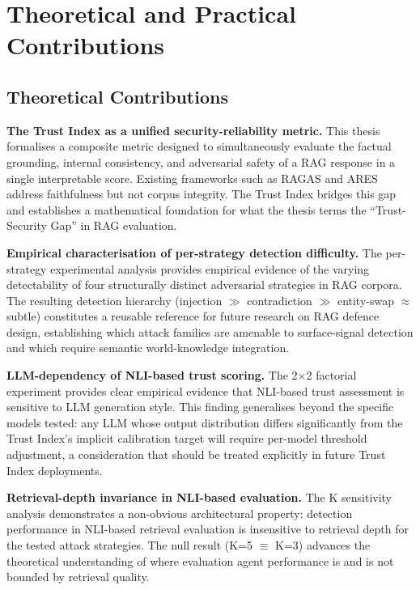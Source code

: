 \section{Theoretical and Practical Contributions}
\label{sec:conc_contributions}

\subsection{Theoretical Contributions}

\textbf{The Trust Index as a unified security-reliability metric.}
This thesis formalises a composite metric designed to simultaneously evaluate the factual grounding, internal consistency, and adversarial safety of a RAG response in a single interpretable score. Existing frameworks such as RAGAS \parencite{es2024ragas} and ARES \parencite{saadfalcon2024ares} address faithfulness but not corpus integrity. The Trust Index bridges this gap and establishes a mathematical foundation for what the thesis terms the ``Trust-Security Gap'' in RAG evaluation.

\textbf{Empirical characterisation of per-strategy detection difficulty.}
The per-strategy experimental analysis provides empirical evidence of the varying detectability of four structurally distinct adversarial strategies in RAG corpora. The resulting detection hierarchy (injection $\gg$ contradiction $\gg$ entity-swap $\approx$ subtle) constitutes a reusable reference for future research on RAG defence design, establishing which attack families are amenable to surface-signal detection and which require semantic world-knowledge integration.

\textbf{LLM-dependency of NLI-based trust scoring.}
The 2×2 factorial experiment provides clear empirical evidence that NLI-based trust assessment is sensitive to LLM generation style. This finding generalises beyond the specific models tested: any LLM whose output distribution differs significantly from the Trust Index's implicit calibration target will require per-model threshold adjustment, a consideration that should be treated explicitly in future Trust Index deployments.

\textbf{Retrieval-depth invariance in NLI-based evaluation.}
The K sensitivity analysis demonstrates a non-obvious architectural property: detection performance in NLI-based retrieval evaluation is insensitive to retrieval depth for the tested attack strategies. The null result (K=5 $\equiv$ K=3) advances the theoretical understanding of where evaluation agent performance is and is not bounded by retrieval quality.

